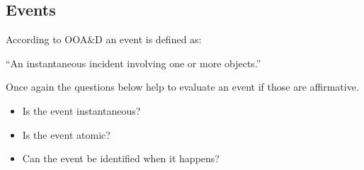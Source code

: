 \subsection{Events}

According to OOA\&D an event is defined as\citep[p.~53]{Rod-Aalborg}:

``An instantaneous incident involving one or more objects.''

Once again the questions below help to evaluate an event if those are affirmative\citep[p.~65]{Rod-Aalborg}.
\begin{itemize}
	\item Is the event instantaneous?
	\item Is the event atomic?
	\item Can the event be identified when it happens?
\end{itemize}

